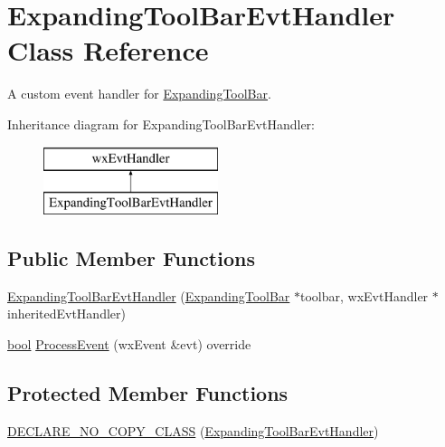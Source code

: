 \hypertarget{class_expanding_tool_bar_evt_handler}{}\section{Expanding\+Tool\+Bar\+Evt\+Handler Class Reference}
\label{class_expanding_tool_bar_evt_handler}


A custom event handler for \hyperlink{class_expanding_tool_bar}{Expanding\+Tool\+Bar}.  


Inheritance diagram for Expanding\+Tool\+Bar\+Evt\+Handler\+:\begin{figure}[H]
\begin{center}
\leavevmode
\includegraphics[height=2.000000cm]{class_expanding_tool_bar_evt_handler}
\end{center}
\end{figure}
\subsection*{Public Member Functions}
\begin{DoxyCompactItemize}
\item 
\hyperlink{class_expanding_tool_bar_evt_handler_a3f8dd58c674b3fd667ed84487b58313a}{Expanding\+Tool\+Bar\+Evt\+Handler} (\hyperlink{class_expanding_tool_bar}{Expanding\+Tool\+Bar} $\ast$toolbar, wx\+Evt\+Handler $\ast$inherited\+Evt\+Handler)
\item 
\hyperlink{mac_2config_2i386_2lib-src_2libsoxr_2soxr-config_8h_abb452686968e48b67397da5f97445f5b}{bool} \hyperlink{class_expanding_tool_bar_evt_handler_ab87ba9c5a3dd85608e1e9e818ed9f02d}{Process\+Event} (wx\+Event \&evt) override
\end{DoxyCompactItemize}
\subsection*{Protected Member Functions}
\begin{DoxyCompactItemize}
\item 
\hyperlink{class_expanding_tool_bar_evt_handler_a5ee1bae0d3bfe6cf069dee65f0d45d85}{D\+E\+C\+L\+A\+R\+E\+\_\+\+N\+O\+\_\+\+C\+O\+P\+Y\+\_\+\+C\+L\+A\+SS} (\hyperlink{class_expanding_tool_bar_evt_handler}{Expanding\+Tool\+Bar\+Evt\+Handler})
\end{DoxyCompactItemize}
